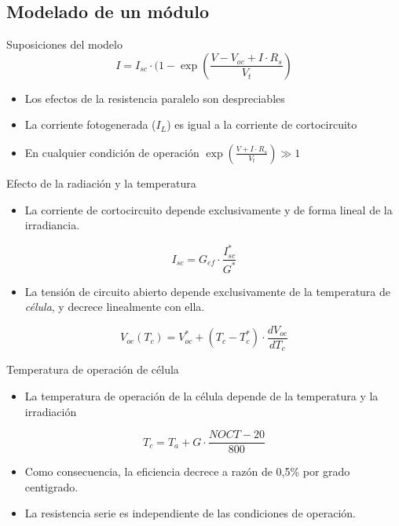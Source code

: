 \documentclass[xcolor={usenames,svgnames,dvipsnames}]{beamer}
\begin{document}
\subsection{Modelado de un módulo}
\label{sec:orgcb21cac}

\begin{frame}[label={sec:orge5b5d91}]{Suposiciones del modelo}
\[
I=I_{sc}\cdot(1-\exp(\frac{V-V_{oc}+I\cdot R_{s}}{V_{t}})
\]

\begin{itemize}[<+->]
\item Los efectos de la resistencia paralelo son despreciables

\item La corriente fotogenerada (\(I_{L}\)) es igual a la corriente de cortocircuito

\item En cualquier condición de operación \(\exp(\frac{V+I\cdot R_{s}}{V_{t}})\gg1\)
\end{itemize}
\end{frame}


\begin{frame}[label={sec:orged3445a}]{Efecto de la radiación y la temperatura}
\begin{itemize}[<+->]
\item La \alert{corriente de cortocircuito} depende exclusivamente y de forma lineal de la \alert{irradiancia}.
\end{itemize}
\[
\boxed{I_{sc}=G_{ef}\cdot\frac{I_{sc}^{*}}{G^{*}}}
\]

\begin{itemize}
\item La \alert{tensión de circuito abierto} depende exclusivamente de la \alert{temperatura de \emph{célula}}, y decrece linealmente con ella.
\end{itemize}
\[
\boxed{V_{oc}(T_{c})=V_{oc}^{*}+(T_{c}-T_{c}^{*})\cdot\frac{dV_{oc}}{dT_{c}}}
\]
\end{frame}

\begin{frame}[label={sec:org8928b50}]{Temperatura de operación de célula}
\begin{itemize}
\item La \alert{temperatura de operación de la célula} depende de la \alert{temperatura y la irradiación}
\end{itemize}
\[
\boxed{T_{c}=T_{a}+G\cdot\frac{NOCT-20}{800}}
\]
\begin{itemize}
\item Como consecuencia, la \alert{eficiencia decrece} a razón de 0,5\% por grado centigrado.

\item La \alert{resistencia serie} es \alert{independiente} de las condiciones de operación.
\end{itemize}
\end{frame}
\end{document}
